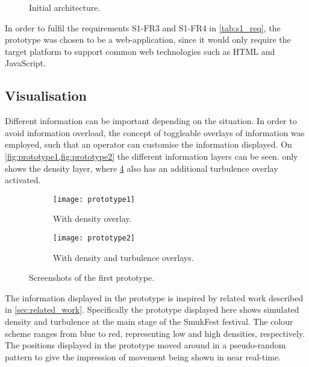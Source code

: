 \begin{figure}[htbp]
    \centering
    \caption{Initial architecture.}
    \label{fig:init_architecture}
\end{figure}


In order to fulfil the requirements S1-FR3 and S1-FR4 in \cref{tab:s1_req}, the prototype was chosen to be a web-application, since it would only require the target platform to support common web technologies such as HTML and JavaScript.

\subsection{Visualisation}
Different information can be important depending on the situation. In order to avoid information overload, the concept of toggleable overlays of information was employed, such that an operator can customise the information displayed. On \cref{fig:prototype1,fig:prototype2} the different information layers can be seen.  only shows the density layer, where \cref{fig:prototype2} also has an additional turbulence overlay activated.

\begin{figure}[htbp]
\centering
\begin{subfigure}{.48\textwidth}
    \texttt{[image: prototype1]}
    \caption{With density overlay.}\label{fig:prototype1}
\end{subfigure}
\quad %
\begin{subfigure}{.48\textwidth}
    \texttt{[image: prototype2]}
    \caption{With density and turbulence overlays.}\label{fig:prototype2}
\end{subfigure}
\caption{Screenshots of the first prototype.}
\end{figure}

The information displayed in the prototype is inspired by related work described in \cref{sec:related_work}. Specifically the prototype displayed here shows simulated density and turbulence at the main stage of the SmukFest festival. The colour scheme ranges from blue to red, representing low and high densities, respectively. The positions displayed in the prototype moved around in a pseudo-random pattern to give the impression of movement being shown in near real-time.